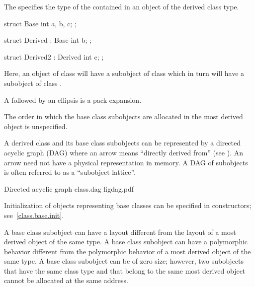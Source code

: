 \pnum
The  specifies the type of the
 contained in an
object of the derived class type.
\begin{example}
\begin{codeblock}
struct Base {
  int a, b, c;
};
\end{codeblock}

\begin{codeblock}
struct Derived : Base {
  int b;
};
\end{codeblock}

\begin{codeblock}
struct Derived2 : Derived {
  int c;
};
\end{codeblock}

Here, an object of class  will have a subobject of class
 which in turn will have a subobject of class
.
\end{example}

\pnum
A  followed by an ellipsis is a pack
expansion.

\pnum
The order in which the base class subobjects are allocated in the most
derived object is unspecified.
\begin{note}
%
%
%
A derived class and its base class subobjects can be represented by a
directed acyclic graph (DAG) where an arrow means ``directly derived
from'' (see ).
An arrow need not have a physical representation in memory.
A DAG of subobjects is often referred to as a ``subobject lattice''.
\end{note}

\begin{importgraphic}
{Directed acyclic graph}
{class.dag}
{figdag.pdf}
\end{importgraphic}

\pnum
\begin{note}
Initialization of objects representing base classes can be specified in
constructors; see~\ref{class.base.init}.
\end{note}

\pnum
\begin{note}
A base class subobject can have a layout different
from the layout of a most derived object of the same type. A base class
subobject can have a polymorphic behavior
different from the polymorphic behavior of a most derived object of the
same type. A base class subobject can be of zero size;
however, two subobjects that have the same class type and that belong to
the same most derived object cannot be allocated at the same
address.
\end{note}

